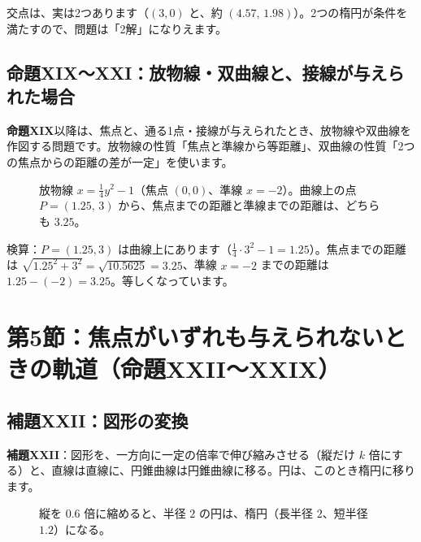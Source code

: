 \documentclass[a4paper,11pt,openany]{ltjsbook}
\begin{document}
交点は、実は2つあります（$(3,0)$ と、約 $(4.57,\,1.98)$）。2つの楕円が条件を満たすので、問題は「2解」になりえます。

\subsection{命題XIX〜XXI：放物線・双曲線と、接線が与えられた場合}

\textbf{命題XIX}以降は、焦点と、通る1点・接線が与えられたとき、放物線や双曲線を作図する問題です。放物線の性質「焦点と準線から等距離」、双曲線の性質「2つの焦点からの距離の差が一定」を使います。

\begin{figure}[htbp]
\centering
{}
\caption{放物線 $x=\frac14y^2-1$（焦点 $(0,0)$、準線 $x=-2$）。曲線上の点 $P=(1.25,\,3)$ から、焦点までの距離と準線までの距離は、どちらも $3.25$。}
\end{figure}

検算：$P=(1.25,3)$ は曲線上にあります（$\frac14\cdot3^2-1=1.25$）。焦点までの距離は $\sqrt{1.25^2+3^2}=\sqrt{10.5625}=3.25$、準線 $x=-2$ までの距離は $1.25-(-2)=3.25$。等しくなっています。

\section{第5節：焦点がいずれも与えられないときの軌道（命題XXII〜XXIX）}

\subsection{補題XXII：図形の変換}

\textbf{補題XXII}：図形を、一方向に一定の倍率で伸び縮みさせる（縦だけ $k$ 倍にする）と、直線は直線に、円錐曲線は円錐曲線に移る。円は、このとき楕円に移ります。

\begin{figure}[htbp]
\centering
{}
\caption{縦を $0.6$ 倍に縮めると、半径 $2$ の円は、楕円（長半径 $2$、短半径 $1.2$）になる。}
\end{figure}
\end{document}
